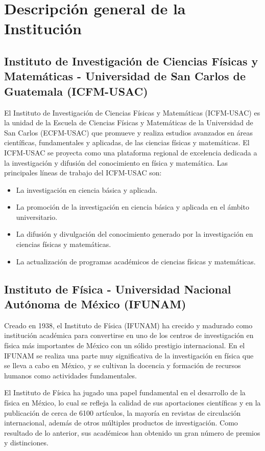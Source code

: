 \documentclass[11pt, spanish, letterpage]{article} %
\begin{document}
\section{Descripción general de la Institución} %
\subsection{Instituto de Investigación de Ciencias Físicas y Matemáticas -
	Universidad de San Carlos de Guatemala (ICFM-USAC)}  %

El Instituto de Investigación de Ciencias Físicas y Matemáticas (ICFM-USAC) es
la unidad de la Escuela de Ciencias Físicas y Matemáticas de la Universidad de
San Carlos (ECFM-USAC) que promueve y realiza estudios avanzados en áreas 
científicas, fundamentales y aplicadas, de las ciencias físicas y matemáticas.
El ICFM-USAC se proyecta como una plataforma regional de excelencia dedicada a
la investigación y difusión del conocimiento en física y matemática. Las 
principales líneas de trabajo del ICFM-USAC son:
\begin{itemize}
	\item La investigación en ciencia básica y aplicada.
	\item La promoción de la investigación en ciencia básica y aplicada en el ámbito universitario.
	\item La difusión y divulgación del conocimiento generado por la investigación en ciencias físicas y matemáticas. 
	\item La actualización de programas académicos de ciencias físicas y matemáticas.
\end{itemize}
\subsection{Instituto de Física - Universidad Nacional Autónoma de México (IFUNAM)} %
Creado en 1938, el Instituto de Física (IFUNAM) ha crecido y madurado como
institución académica para convertirse en uno de los centros de investigación
en física más importantes de México con un sólido prestigio internacional. En
el IFUNAM se realiza una parte muy significativa de la investigación en física
que se lleva a cabo en México, y se cultivan la docencia y formación de
recursos humanos como actividades fundamentales.

El Instituto de Física ha jugado una papel fundamental en el desarrollo de la
física en México, lo cual se refleja la calidad de sus aportaciones científicas
y en la publicación de cerca de 6100 artículos, la mayoría en revistas de
circulación internacional, además de otros múltiples productos de
investigación. Como resultado de lo anterior, sus académicos han obtenido un
gran número de premios y distinciones.
\end{document}
